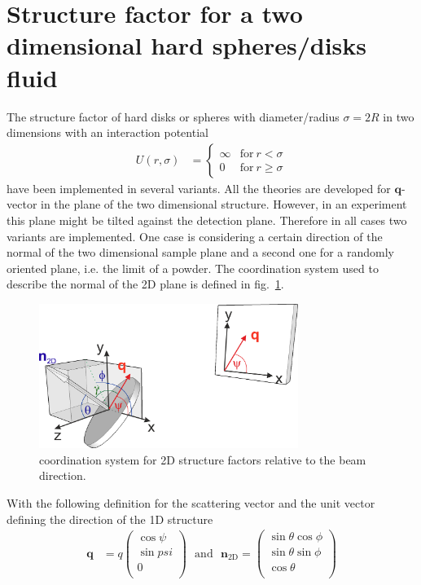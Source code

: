 \section{Structure factor for a two dimensional hard spheres/disks fluid} \hspace{1pt}
The structure factor of hard disks or spheres with diameter/radius $\sigma=2R$ in two dimensions with an interaction potential
\begin{align}
U(r,\sigma) &=
\begin{cases}
\infty &\mathrm{for~}  r < \sigma \\
0  &\mathrm{for~}  r \geq \sigma
\end{cases}
\end{align}
have been implemented in several variants. All the theories are developed for $\mathbf{q}$-vector in the plane of the two dimensional structure. However, in an experiment this plane might be tilted against the detection plane. Therefore
in all cases two variants are implemented. One case is considering a certain direction of the normal of the two dimensional sample plane and a second one for a randomly oriented plane, i.e. the limit of a powder.
The coordination system used to describe the normal of the 2D plane is defined in fig.\ \ref{fig:coord_SQ2D}.
\begin{figure}[htb]
\begin{center}
\includegraphics[width=0.75\textwidth]{../images/structure_factor/SQ_1D_2D/coord_SQ_2D.png}
\end{center}
\caption{coordination system for 2D structure factors relative to the beam direction.}
\label{fig:coord_SQ2D}
\end{figure}
With the following definition for the scattering vector and the unit vector defining the direction of the 1D structure
\begin{align}
  \mathbf{q} &=q  \begin{pmatrix}
               \cos \psi \\
               \sin psi \\
               0 \\
             \end{pmatrix}
   \mbox{~~and~~}
  \mathbf{n}_\mathrm{2D} =
    \begin{pmatrix}
        \sin \theta \cos \phi  \\
        \sin \theta \sin \phi \\
        \cos \theta \\
    \end{pmatrix} \\
\end{align}
